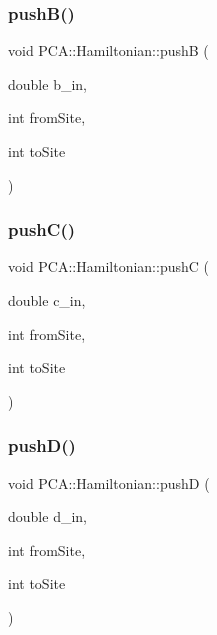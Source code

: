 \hypertarget{class_p_c_a_1_1_hamiltonian_a5390261dba56862d9ce18d0102f81ce1}{}\label{class_p_c_a_1_1_hamiltonian_a5390261dba56862d9ce18d0102f81ce1} 
\subsubsection{\texorpdfstring{push\+B()}{pushB()}}
{\footnotesize\ttfamily void P\+C\+A\+::\+Hamiltonian\+::pushB (\begin{DoxyParamCaption}\item[{double}]{b\+\_\+in,  }\item[{int}]{from\+Site,  }\item[{int}]{to\+Site }\end{DoxyParamCaption})}

\hypertarget{class_p_c_a_1_1_hamiltonian_a9ca9ef677e2fedc8d82faca80e216e17}{}\label{class_p_c_a_1_1_hamiltonian_a9ca9ef677e2fedc8d82faca80e216e17} 
\subsubsection{\texorpdfstring{push\+C()}{pushC()}}
{\footnotesize\ttfamily void P\+C\+A\+::\+Hamiltonian\+::pushC (\begin{DoxyParamCaption}\item[{double}]{c\+\_\+in,  }\item[{int}]{from\+Site,  }\item[{int}]{to\+Site }\end{DoxyParamCaption})}

\hypertarget{class_p_c_a_1_1_hamiltonian_a8f0f25f18c67f7943714d086737e427f}{}\label{class_p_c_a_1_1_hamiltonian_a8f0f25f18c67f7943714d086737e427f} 
\subsubsection{\texorpdfstring{push\+D()}{pushD()}}
{\footnotesize\ttfamily void P\+C\+A\+::\+Hamiltonian\+::pushD (\begin{DoxyParamCaption}\item[{double}]{d\+\_\+in,  }\item[{int}]{from\+Site,  }\item[{int}]{to\+Site }\end{DoxyParamCaption})}

